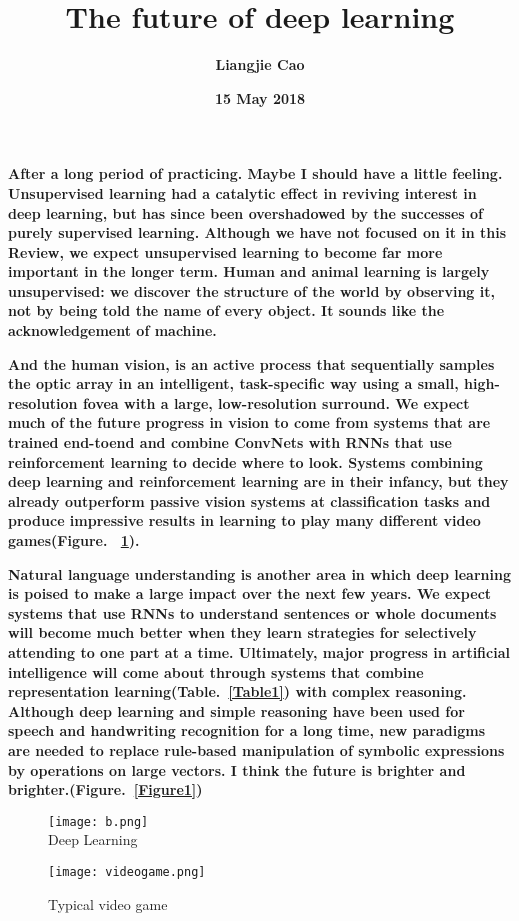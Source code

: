 \documentclass[35pt]{article}
\begin{document}
\title{\textbf{The future of deep learning}}
\author{\textbf{Liangjie Cao}}
\date{\textbf{15 May 2018}}
\maketitle
\par
\setlength{\baselineskip}{30pt}
\textbf{After a long period of practicing. Maybe I should have a little feeling. Unsupervised learning had a catalytic effect in reviving interest in deep learning, but has since been overshadowed by the successes of purely supervised learning. Although we have not focused on it in this Review, we expect unsupervised learning to become far more important in the longer term. Human and animal learning is largely unsupervised: we discover the structure of the world by observing it, not by being told the name of every object. It sounds like the acknowledgement of machine. }
\par
\textbf{And the human vision, is an active process that sequentially samples the optic array in an intelligent, task-speciﬁc way using a small, high-resolution fovea with a large, low-resolution surround. We expect much of the future progress in vision to come from systems that are trained end-toend and combine ConvNets with RNNs that use reinforcement learning to decide where to look. Systems combining deep learning and reinforcement learning are in their infancy, but they already outperform passive vision systems at classification tasks and produce impressive results in learning to play many different video games(Figure. ~\ref{Figure2}). \cite{name1}}
\par
\textbf{Natural language understanding is another area in which deep learning is poised to make a large impact over the next few years. We expect systems that use RNNs to understand sentences or whole documents will become much better when they learn strategies for selectively attending to one part at a time. Ultimately, major progress in artificial intelligence will come about through systems that combine representation learning(Table.~\ref{Table1}) with complex reasoning. Although deep learning and simple reasoning have been used for speech and handwriting recognition for a long time, new paradigms are needed to replace rule-based manipulation of symbolic expressions by operations on large vectors. I think the future is brighter and brighter.(Figure.~\ref{Figure1})}\\
\newpage
\onecolumn
 \begin{figure}[htbp]
 \centering
 \texttt{[image: b.png]}\\
 \caption{Deep Learning}\label{Figure1}
  \centering
 \texttt{[image: videogame.png]}\\
 \caption{Typical video game}\label{Figure2}
\end{figure}
\end{document}
